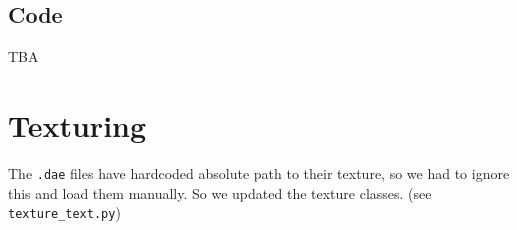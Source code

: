 \documentclass[11pt]{article}
\begin{document}
\subsection*{Code}
TBA

\section{Texturing}
\noindent The \texttt{.dae} files have hardcoded absolute path to their texture, so we had to ignore this and load them manually. So we updated the texture classes. (see \texttt{texture\_text.py})
\end{document}
